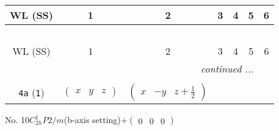 \documentclass[fleqn,9pt,landscape]{jsarticle}
\begin{document}
\begin{center}
\renewcommand{\arraystretch}{1.2}
\begin{longtable}{ccccccc}
 \hline \hline
WL (SS) & 1 & 2 & 3 & 4 & 5 & 6 \\ \hline \endfirsthead

\multicolumn{6}{l}{\tablename\ \thetable{}} \\
 \hline \hline
WL (SS) & 1 & 2 & 3 & 4 & 5 & 6 \\ \hline \endhead

 \hline \hline
\multicolumn{6}{r}{\footnotesize\it continued ...} \\ \endfoot

 \hline \hline
\multicolumn{6}{r}{} \\ \endlastfoot

{\tt 4a} ({\tt 1}) & $ \begin{pmatrix} x & y & z \end{pmatrix} $ & $ \begin{pmatrix} x & - y & z + \frac{1}{2} \end{pmatrix} $ \\
\end{longtable}
\end{center}
\newpage
No. 10\quad$C_{2h}^{1}$\quad$P2/m$\quad(b-axis setting)\quad[ monoclinic ]\quad$+\begin{pmatrix} 0 & 0 & 0 \end{pmatrix}$
\end{document}
